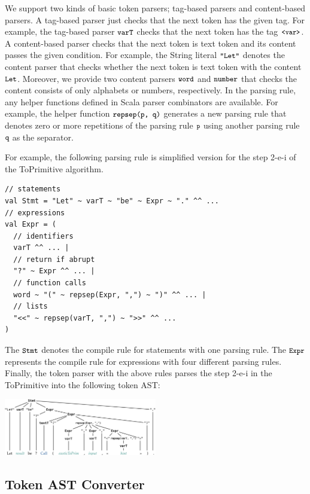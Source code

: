 We support two kinds of basic token parsers; tag-based parsers and
content-based parsers. A tag-based parser just checks that the next
token has the given tag. For example, the tag-based parser \( \texttt{\small varT} \)
checks that the next token has the tag \( \texttt{\small<var>} \). A content-based parser
checks that the next token is text token and its content passes the given condition.
For example, the String literal \( \texttt{\small"Let"} \) denotes the content parser
that checks whether the next token is text token with the content \( \texttt{\small Let} \).
Moreover, we provide two content parsers \( \texttt{\small word} \) and \( \texttt{\small number} \)
that checks the content consists of only alphabets or numbers, respectively.
In the parsing rule, any helper functions defined in Scala parser combinators
are available. For example, the helper function \( \texttt{\small repsep(p, q)} \) generates a new
parsing rule that denotes zero or more repetitions of the parsing rule \( \texttt{\small p} \)
using another parsing rule \( \texttt{\small q} \) as the separator.

For example, the following parsing rule is simplified version for
the step 2-e-i of the ToPrimitive algorithm.
\begin{lstlisting}[style=myScalastyle]
// statements
val Stmt = "Let" ~ varT ~ "be" ~ Expr ~ "." ^^ ...
// expressions
val Expr = (
  // identifiers
  varT ^^ ... |
  // return if abrupt
  "?" ~ Expr ^^ ... |
  // function calls
  word ~ "(" ~ repsep(Expr, ",") ~ ")" ^^ ... |
  // lists
  "<<" ~ repsep(varT, ",") ~ ">>" ^^ ...
)
\end{lstlisting}
The \( \texttt{\small Stmt} \) denotes the compile rule for statements with one
parsing rule. The \( \texttt{\small Expr} \) represents the compile rule for expressions
with four different parsing rules. Finally, the token parser with the above rules
parses the step 2-e-i in the ToPrimitive into the following
token AST:
\begin{center}
\includegraphics[width=0.5\textwidth]{img/token_ast.png}
\end{center}

\subsection{Token AST Converter}

